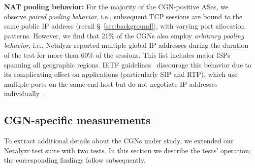 \documentclass[10pt]{sig-alternate-05-2015}
\newcommand\xref[1]{\S~\ref{#1}}
\newcommand{\neta}{Netalyzr\xspace}
\newcommand{\parax}[1]{\vspace{0.2em} \noindent \textbf{#1:}}
\begin{document}
\parax{NAT pooling behavior} For the majority of the CGN-positive ASes, we 
observe \textit{paired pooling behavior}, i.e., subsequent TCP sessions are 
bound to the same public IP address (recall \xref{sec:background}),
with varying port allocation patterns. However, we find that 21\% of the 
CGNs also employ \textit{arbitrary pooling behavior}, i.e.,  \neta reported
multiple global IP addresses during the duration of the test for more
than 60\% of the sessions. This list includes major ISPs spanning all 
geographic regions.
IETF guidelines~\cite{rfc4787} discourage this behavior due to its
complicating effect on applications (particularly SIP and RTP), which
use multiple ports on the same end host but do not negotiate IP
addresses individually~\cite{Johnston:2009:SUS:1804456, rfc4787}.


\begin{table}
\footnotesize
{}
\caption{Port allocation strategies observed for CGN ASes. For ASes
  implementing chunk-based random port allocation we estimate the
  per-subscriber chunk size.
}
\label{table:portmapping}
\end{table}

\subsection{CGN-specific measurements}

To extract additional details about the CGNs under study, we extended our \neta 
test suite with two tests. In this section we describe the tests'
operation; the corresponding findings follow subsequently.
\end{document}
